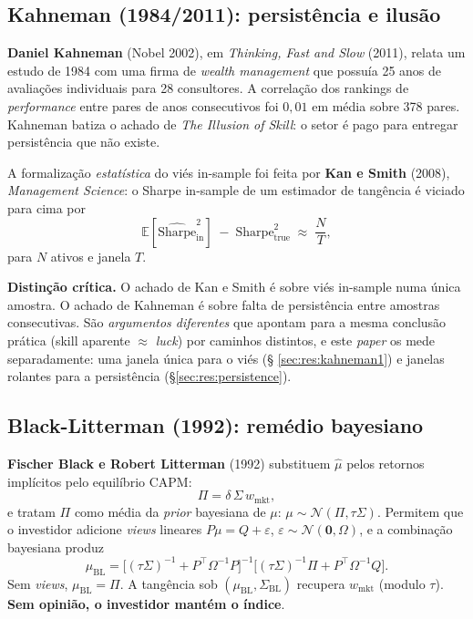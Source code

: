 \documentclass[12pt,a4paper,oneside]{article}
\begin{document}
\subsection{Kahneman (1984/2011): persistência e ilusão}

\textbf{Daniel Kahneman} (Nobel 2002), em \textit{Thinking, Fast and
Slow} (2011), relata um estudo de 1984 com uma firma de
\textit{wealth management} que possuía 25 anos de avaliações
individuais para 28 consultores. A correlação dos rankings de
\textit{performance} entre pares de anos consecutivos foi $0{,}01$
em média sobre 378 pares. Kahneman batiza o achado de \textit{The
Illusion of Skill}: o setor é pago para entregar persistência que
não existe.

A formalização \textit{estatística} do viés in-sample foi feita por
\textbf{Kan e Smith} (2008), \textit{Management Science}: o Sharpe
in-sample de um estimador de tangência é viciado para cima por
\begin{equation}\label{eq:kan-smith}
\mathbb{E}[\widehat{\mathrm{Sharpe}}^2_{\text{in}}] \;-\;
\mathrm{Sharpe}^2_{\text{true}} \;\approx\; \frac{N}{T},
\end{equation}
para $N$ ativos e janela $T$.

\textbf{Distinção crítica.} O achado de Kan e Smith é sobre viés
in-sample numa única amostra. O achado de Kahneman é sobre falta de
persistência entre amostras consecutivas. São \textit{argumentos
diferentes} que apontam para a mesma conclusão prática (skill aparente
$\approx$ \textit{luck}) por caminhos distintos, e este \textit{paper}
os mede separadamente: uma janela única para o viés (\S
\ref{sec:res:kahneman1}) e janelas rolantes para a persistência
(\S \ref{sec:res:persistence}).

\subsection{Black-Litterman (1992): remédio bayesiano}

\textbf{Fischer Black e Robert Litterman} (1992) substituem $\hat{\mu}$
pelos retornos implícitos pelo equilíbrio CAPM:
\begin{equation}\label{eq:bl-pi}
\Pi = \delta \, \Sigma \, w_{\text{mkt}},
\end{equation}
e tratam $\Pi$ como média da \textit{prior} bayesiana de $\mu$:
$\mu \sim \mathcal{N}(\Pi, \tau \Sigma)$. Permitem que o investidor
adicione \textit{views} lineares $P\mu = Q + \varepsilon$,
$\varepsilon \sim \mathcal{N}(\mathbf{0}, \Omega)$, e a combinação
bayesiana produz
\begin{equation}\label{eq:bl-posterior}
\mu_{\text{BL}} = \bigl[(\tau \Sigma)^{-1} + P^\top \Omega^{-1} P\bigr]^{-1}
\bigl[(\tau \Sigma)^{-1} \Pi + P^\top \Omega^{-1} Q\bigr].
\end{equation}
Sem \textit{views}, $\mu_{\text{BL}} = \Pi$. A tangência sob
$(\mu_{\text{BL}}, \Sigma_{\text{BL}})$ recupera $w_{\text{mkt}}$
(modulo $\tau$). \textbf{Sem opinião, o investidor mantém o índice}.
\end{document}
